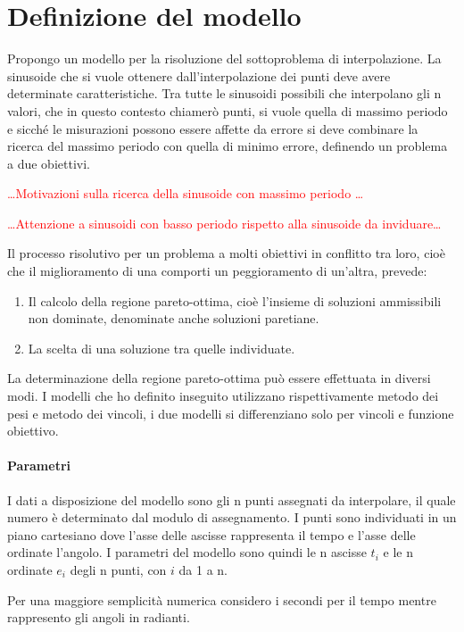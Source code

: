 \documentclass[a4paper,12pt]{report}
\begin{document}
\section{Definizione del modello}
Propongo un modello per la risoluzione del sottoproblema di interpolazione.
La sinusoide che si vuole ottenere dall'interpolazione dei punti deve avere determinate caratteristiche. Tra tutte le sinusoidi possibili che interpolano gli n valori, che in questo contesto chiamerò punti, si vuole quella di massimo periodo e sicché le misurazioni possono essere affette da errore si deve combinare la ricerca del massimo periodo con quella di minimo errore, definendo un problema a due obiettivi.

\textcolor{red}{\dots Motivazioni sulla ricerca della sinusoide con massimo periodo \dots}

\textcolor{red}{\dots Attenzione a sinusoidi con basso periodo rispetto alla sinusoide da inviduare\dots}

Il processo risolutivo per un problema a molti obiettivi in conflitto tra loro, cioè che il miglioramento di una comporti un peggioramento di un'altra, prevede:
\begin{enumerate}
  \item Il calcolo della regione pareto-ottima, cioè l'insieme di soluzioni ammissibili non dominate, denominate anche soluzioni paretiane.
  \item La scelta di una soluzione tra quelle individuate.
\end{enumerate}
La determinazione della regione pareto-ottima può essere effettuata in diversi modi. I modelli che ho definito inseguito utilizzano rispettivamente metodo dei pesi e metodo dei vincoli, i due modelli si differenziano solo per vincoli e funzione obiettivo.

\paragraph{Parametri}

I dati a disposizione del modello sono gli n punti assegnati da interpolare, il quale numero è determinato dal modulo di assegnamento. I punti sono individuati in un piano cartesiano dove l'asse delle ascisse rappresenta il tempo e l'asse delle ordinate l'angolo. I parametri del modello sono quindi le n ascisse $t_i$ e le n ordinate $e_i$ degli n punti, con $i$ da 1 a n.

Per una maggiore semplicità numerica considero i secondi per il tempo mentre rappresento gli angoli in radianti.
\end{document}
